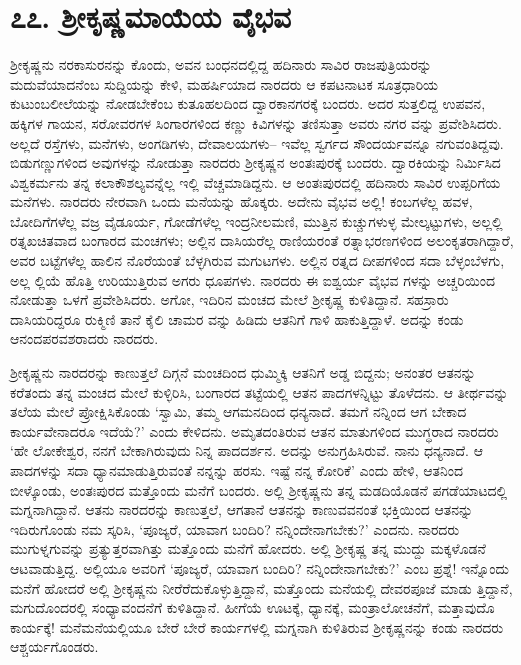 
\chapter{೭೭. ಶ್ರೀಕೃಷ್ಣಮಾಯೆಯ ವೈಭವ}

ಶ್ರೀಕೃಷ್ಣನು ನರಕಾಸುರನನ್ನು ಕೊಂದು, ಅವನ ಬಂಧನದಲ್ಲಿದ್ದ ಹದಿನಾರು ಸಾವಿರ ರಾಜಪುತ್ರಿಯರನ್ನು ಮದುವೆಯಾದನೆಂಬ ಸುದ್ದಿಯನ್ನು ಕೇಳಿ, ಮಹರ್ಷಿಯಾದ ನಾರದರು ಆ ಕಪಟನಾಟಕ ಸೂತ್ರಧಾರಿಯ ಕುಟುಂಬಲೀಲೆಯನ್ನು ನೋಡಬೇಕೆಂಬ ಕುತೂಹಲದಿಂದ ದ್ವಾರಕಾನಗರಕ್ಕೆ ಬಂದರು. ಅದರ ಸುತ್ತಲಿದ್ದ ಉಪವನ, ಹಕ್ಕಿಗಳ ಗಾಯನ, ಸರೋವರಗಳ ಸಿಂಗಾರಗಳಿಂದ ಕಣ್ಣು ಕಿವಿಗಳನ್ನು ತಣಿಸುತ್ತಾ ಅವರು ನಗರ ವನ್ನು ಪ್ರವೇಶಿಸಿದರು. ಅಲ್ಲದೆ ರಸ್ತೆಗಳು, ಮನೆಗಳು, ಅಂಗಡಿಗಳು, ದೇವಾಲಯಗಳು– ಇವೆಲ್ಲ ಸ್ವರ್ಗದ ಸೌಂದರ್ಯವನ್ನೂ ನಗುವಂತಿದ್ದವು. ಬಿಡುಗಣ್ಣುಗಳಿಂದ ಅವುಗಳನ್ನು ನೋಡುತ್ತಾ ನಾರದರು ಶ್ರೀಕೃಷ್ಣನ ಅಂತಃಪುರಕ್ಕೆ ಬಂದರು. ದ್ವಾರಕಿಯನ್ನು ನಿರ್ಮಿಸಿದ ವಿಶ್ವಕರ್ಮನು ತನ್ನ ಕಲಾಕೌಶಲ್ಯವನ್ನೆಲ್ಲ ಇಲ್ಲಿ ವೆಚ್ಚಮಾಡಿದ್ದನು. ಆ ಅಂತಃಪುರದಲ್ಲಿ ಹದಿನಾರು ಸಾವಿರ ಉಪ್ಪರಿಗೆಯ ಮನೆಗಳು. ನಾರದರು ನೇರವಾಗಿ ಒಂದು ಮನೆಯನ್ನು ಹೊಕ್ಕರು. ಅದೇನು ವೈಭವ ಅಲ್ಲಿ! ಕಂಬಗಳೆಲ್ಲ ಹವಳ, ಬೋದಿಗೆಗಳೆಲ್ಲ ವಜ್ರ ವೈಡೂರ್ಯ, ಗೋಡೆಗಳೆಲ್ಲ ಇಂದ್ರನೀಲಮಣಿ, ಮುತ್ತಿನ ಕುಚ್ಚುಗಳುಳ್ಳ ಮೇಲ್ಕಟ್ಟುಗಳು, ಅಲ್ಲಲ್ಲಿ ರತ್ನಖಚಿತವಾದ ಬಂಗಾರದ ಮಂಚಗಳು; ಅಲ್ಲಿನ ದಾಸಿಯರೆಲ್ಲ ರಾಣಿಯರಂತೆ ರತ್ನಾಭರಣಗಳಿಂದ ಅಲಂಕೃತರಾಗಿದ್ದಾರೆ, ಅವರ ಬಟ್ಟೆಗಳೆಲ್ಲ ಹಾಲಿನ ನೊರೆಯಂತೆ ಬೆಳ್ಳಗಿರುವ ಮಗುಟಗಳು. ಅಲ್ಲಿನ ರತ್ನದ ದೀಪಗಳಿಂದ ಸದಾ ಬೆಳ್ಳಂಬೆಳಗು, ಅಲ್ಲ ಲ್ಲಿಯೆ ಹೊತ್ತಿ ಉರಿಯುತ್ತಿರುವ ಅಗರು ಧೂಪಗಳು. ನಾರದರು ಈ ಐಶ್ವರ್ಯ ವೈಭವ ಗಳನ್ನು ಅಚ್ಚರಿಯಿಂದ ನೋಡುತ್ತಾ ಒಳಗೆ ಪ್ರವೇಶಿಸಿದರು. ಅಗೋ, ಇದಿರಿನ ಮಂಚದ ಮೇಲೆ ಶ್ರೀಕೃಷ್ಣ ಕುಳಿತಿದ್ದಾನೆ. ಸಹಸ್ರಾರು ದಾಸಿಯರಿದ್ದರೂ ರುಕ್ಮಿಣಿ ತಾನೆ ಕೈಲಿ ಚಾಮರ ವನ್ನು ಹಿಡಿದು ಆತನಿಗೆ ಗಾಳಿ ಹಾಕುತ್ತಿದ್ದಾಳೆ. ಅದನ್ನು ಕಂಡು ಆನಂದಪರವಶರಾದರು ನಾರದರು.

 ಶ್ರೀಕೃಷ್ಣನು ನಾರದರನ್ನು ಕಾಣುತ್ತಲೆ ದಿಗ್ಗನೆ ಮಂಚದಿಂದ ಧುಮ್ಮಿಕ್ಕಿ ಆತನಿಗೆ ಅಡ್ಡ ಬಿದ್ದನು; ಅನಂತರ ಆತನನ್ನು ಕರೆತಂದು ತನ್ನ ಮಂಚದ ಮೇಲೆ ಕುಳ್ಳಿರಿಸಿ, ಬಂಗಾರದ ತಟ್ಟೆಯಲ್ಲಿ ಆತನ ಪಾದಗಳನ್ನಿಟ್ಟು ತೊಳೆದನು. ಆ ತೀರ್ಥವನ್ನು ತಲೆಯ ಮೇಲೆ ಪ್ರೋಕ್ಷಿಸಿಕೊಂಡು ‘ಸ್ವಾಮಿ, ತಮ್ಮ ಆಗಮನದಿಂದ ಧನ್ಯನಾದೆ. ತಮಗೆ ನನ್ನಿಂದ ಆಗ ಬೇಕಾದ ಕಾರ್ಯವೇನಾದರೂ ಇದೆಯೆ?’ ಎಂದು ಕೇಳಿದನು. ಅಮೃತದಂತಿರುವ ಆತನ ಮಾತುಗಳಿಂದ ಮುಗ್ಧರಾದ ನಾರದರು ‘ಹೇ ಲೋಕೇಶ್ವರ, ನನಗೆ ಬೇಕಾಗಿರುವುದು ನಿನ್ನ ಪಾದದರ್ಶನ. ಅದನ್ನು ಅನುಗ್ರಹಿಸಿರುವೆ. ನಾನು ಧನ್ಯನಾದೆ. ಆ ಪಾದಗಳನ್ನು ಸದಾ ಧ್ಯಾನಮಾಡುತ್ತಿರುವಂತೆ ನನ್ನನ್ನು ಹರಸು. ಇಷ್ಟೆ ನನ್ನ ಕೋರಿಕೆ’ ಎಂದು ಹೇಳಿ, ಆತನಿಂದ ಬೀಳ್ಕೊಂಡು, ಅಂತಃಪುರದ ಮತ್ತೊಂದು ಮನೆಗೆ ಬಂದರು. ಅಲ್ಲಿ ಶ್ರೀಕೃಷ್ಣನು ತನ್ನ ಮಡದಿಯೊಡನೆ ಪಗಡೆಯಾಟದಲ್ಲಿ ಮಗ್ನನಾಗಿದ್ದಾನೆ. ಆತನು ನಾರದರನ್ನು ಕಾಣುತ್ತಲೆ, ಆಗತಾನೆ ಆತನನ್ನು ಕಾಣುವವನಂತೆ ಭಕ್ತಿಯಿಂದ ಆತನನ್ನು ಇದಿರುಗೊಂಡು ನಮ ಸ್ಕರಿಸಿ, ‘ಪೂಜ್ಯರೆ, ಯಾವಾಗ ಬಂದಿರಿ? ನನ್ನಿಂದೇನಾಗಬೇಕು?’ ಎಂದನು. ನಾರದರು ಮುಗುಳ್ನಗುವನ್ನು ಪ್ರತ್ಯುತ್ತರವಾಗಿತ್ತು ಮತ್ತೊಂದು ಮನೆಗೆ ಹೋದರು. ಅಲ್ಲಿ ಶ್ರೀಕೃಷ್ಣ ತನ್ನ ಮುದ್ದು ಮಕ್ಕಳೊಡನೆ ಆಟವಾಡುತ್ತಿದ್ದ. ಅಲ್ಲಿಯೂ ಅವರಿಗೆ ‘ಪೂಜ್ಯರೆ, ಯಾವಾಗ ಬಂದಿರಿ? ನನ್ನಿಂದೇನಾಗಬೇಕು?’ ಎಂಬ ಪ್ರಶ್ನೆ! ಇನ್ನೊಂದು ಮನೆಗೆ ಹೋದರೆ ಅಲ್ಲಿ ಶ್ರೀಕೃಷ್ಣನು ನೀರೆರೆದುಕೊಳ್ಳುತ್ತಿದ್ದಾನೆ, ಮತ್ತೊಂದು ಮನೆಯಲ್ಲಿ ದೇವರಪೂಜೆ ಮಾಡು ತ್ತಿದ್ದಾನೆ, ಮಗುದೊಂದರಲ್ಲಿ ಸಂಧ್ಯಾವಂದನೆಗೆ ಕುಳಿತಿದ್ದಾನೆ. ಹೀಗೆಯೆ ಊಟಕ್ಕೆ, ಧ್ಯಾನಕ್ಕೆ, ಮಂತ್ರಾಲೋಚನೆಗೆ, ಮತ್ತಾವುದೊ ಕಾರ್ಯಕ್ಕೆ! ಮನೆಮನೆಯಲ್ಲಿಯೂ ಬೇರೆ ಬೇರೆ ಕಾರ್ಯಗಳಲ್ಲಿ ಮಗ್ನನಾಗಿ ಕುಳಿತಿರುವ ಶ್ರೀಕೃಷ್ಣನನ್ನು ಕಂಡು ನಾರದರು ಆಶ್ಚರ್ಯಗೊಂಡರು.

